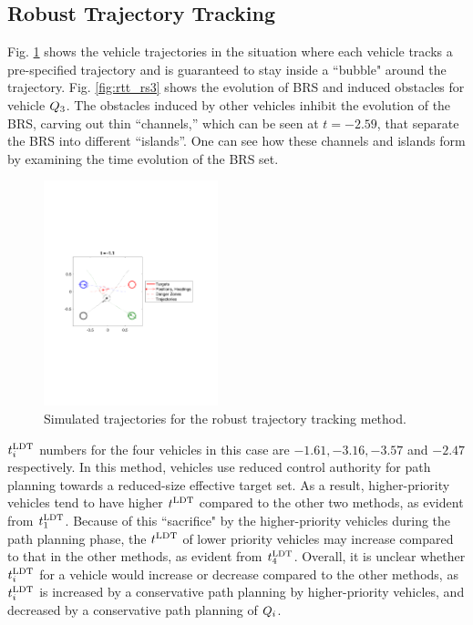 \subsection{Robust Trajectory Tracking}
Fig. \ref{fig:rtt_traj} shows the vehicle trajectories in the situation where each vehicle tracks a pre-specified trajectory and is guaranteed to stay inside a ``bubble" around the trajectory. Fig. \ref{fig:rtt_rs3} shows the evolution of BRS and induced obstacles for vehicle $Q_3$. The obstacles induced by other vehicles inhibit the evolution of the BRS, carving out thin “channels,” which can be seen at $t = -2.59$, that separate the BRS into different “islands”. One can see how these channels and islands form by examining the time evolution of the BRS set.

\begin{figure}
  \centering
  \includegraphics[width=0.45\textwidth]{"fig/rtt_traj"}
  \caption{Simulated trajectories for the robust trajectory tracking method.}
  \label{fig:rtt_traj}
\end{figure}

$t^\text{LDT}_i$ numbers for the four vehicles in this case are $-1.61, -3.16, -3.57$ and $-2.47$ respectively. In this method, vehicles use reduced control authority for path planning towards a reduced-size effective target set. As a result, higher-priority vehicles tend to have higher $t^\text{LDT}$ compared to the other two methods, as evident from $t^\text{LDT}_1$. Because of this ``sacrifice" by the higher-priority vehicles during the path planning phase, the $t^\text{LDT}$ of lower priority vehicles may increase compared to that in the other methods, as evident from $t^\text{LDT}_4$. Overall, it is unclear whether $t^\text{LDT}_i$ for a vehicle would increase or decrease compared to the other methods, as $t^\text{LDT}_i$ is increased by a conservative path planning by higher-priority vehicles, and decreased by a conservative path planning of $Q_i$. 

